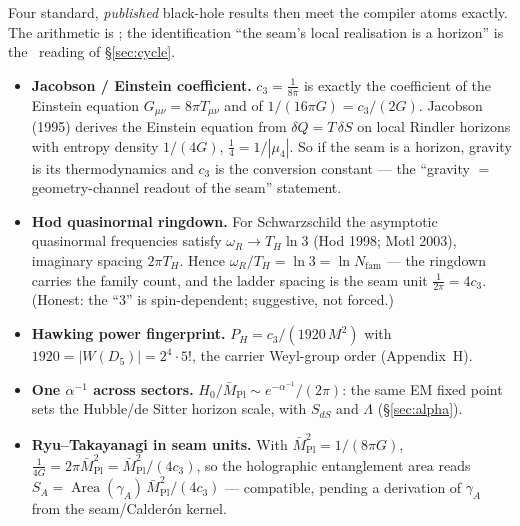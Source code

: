 \documentclass[11pt,a4paper]{article}
\newcommand{\cthree}{c_3}
\newcommand{\Nfam}{N_{\mathrm{fam}}}
\newcommand{\ainv}{\alpha^{-1}}
\begin{document}
\noindent Four standard, \emph{published} black-hole results then meet the compiler atoms exactly. The
arithmetic is \mE; the identification ``the seam's local realisation is a horizon'' is the \mC\ reading of
\S\ref{sec:cycle}.
\begin{itemize}[leftmargin=1.4em]
\item \textbf{Jacobson / Einstein coefficient.} $\cthree=\tfrac1{8\pi}$ is exactly the coefficient of the
Einstein equation $G_{\mu\nu}=8\pi T_{\mu\nu}$ and of $1/(16\pi G)=\cthree/(2G)$. Jacobson (1995) derives
the Einstein equation from $\delta Q=T\,\delta S$ on local Rindler horizons with entropy density
$1/(4G)$, $\tfrac14=1/|\mu_4|$. So if the seam is a horizon, gravity is its thermodynamics and $\cthree$
is the conversion constant --- the ``gravity $=$ geometry-channel readout of the seam'' statement.
\item \textbf{Hod quasinormal ringdown.} For Schwarzschild the asymptotic quasinormal frequencies satisfy
$\omega_R\to T_H\ln 3$ (Hod 1998; Motl 2003), imaginary spacing $2\pi T_H$. Hence
$\omega_R/T_H=\ln 3=\ln\Nfam$ --- the ringdown carries the family count, and the ladder spacing is the
seam unit $\tfrac1{2\pi}=4\cthree$. (Honest: the ``$3$'' is spin-dependent; suggestive, not forced.)
\item \textbf{Hawking power fingerprint.} $P_H=\cthree/(1920\,M^2)$ with $1920=|W(D_5)|=2^4\cdot5!$, the
carrier Weyl-group order (Appendix~H).
\item \textbf{One $\ainv$ across sectors.} $H_0/\bar M_{\mathrm{Pl}}\sim e^{-\ainv}/(2\pi)$: the same EM
fixed point sets the Hubble/de Sitter horizon scale, with $S_{dS}$ and $\Lambda$ (\S\ref{sec:alpha}).
\item \textbf{Ryu--Takayanagi in seam units.} With $\bar M_{\mathrm{Pl}}^2=1/(8\pi G)$,
$\tfrac1{4G}=2\pi\bar M_{\mathrm{Pl}}^2=\bar M_{\mathrm{Pl}}^2/(4\cthree)$, so the holographic entanglement
area reads $S_A=\operatorname{Area}(\gamma_A)\,\bar M_{\mathrm{Pl}}^2/(4\cthree)$ --- compatible, pending a
derivation of $\gamma_A$ from the seam/Calder\'on kernel.
\end{itemize}
\,
\end{document}
